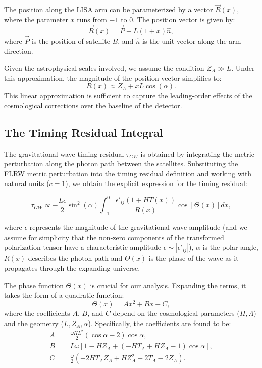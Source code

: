 \documentclass[twocolumn]{revtex4-2}
\begin{document}
The position along the LISA arm can be parameterized by a vector $\vec{R}(x)$, where the parameter $x$ runs from $-1$ to $0$. The position vector is given by:
\begin{equation}
\vec{R}(x) = \vec{P} + L(1+x)\hat{n},
\label{eq:position_vector}
\end{equation}
where $\vec{P}$ is the position of satellite $B$, and $\hat{n}$ is the unit vector along the arm direction. 

Given the astrophysical scales involved, we assume the condition $Z_A \gg L$. Under this approximation, the magnitude of the position vector simplifies to:
\begin{equation}
R(x) \approx Z_A + xL \cos(\alpha).
\label{eq:R_approx}
\end{equation}
This linear approximation is sufficient to capture the leading-order effects of the cosmological corrections over the baseline of the detector.


\subsection{The Timing Residual Integral}
The gravitational wave timing residual $\tau_{GW}$ is obtained by integrating the metric perturbation along the photon path between the satellites. Substituting the FLRW metric perturbation into the timing residual definition and working with natural units ($c=1$), we obtain the explicit expression for the timing residual:

\begin{equation}
\tau_{GW} \propto -\frac{L\epsilon}{2}\sin^{2}(\alpha) \int_{-1}^{0} \frac{\epsilon'_{ij}(1+H T(x))}{R(x)}  \cos[\Theta(x)] dx,
\label{eq:tau_explicit}
\end{equation}

\noindent where $\epsilon$ represents the magnitude of the gravitational wave amplitude (and we assume for simplicity that the non-zero components of the transformed polarization tensor have a characteristic amplitude $\epsilon \sim |\epsilon'_{ij}|$), $\alpha$ is the polar angle, $R(x)$ describes the photon path and $\Theta(x)$ is the phase of the wave as it propagates through the expanding universe. 

The phase function $\Theta(x)$ is crucial for our analysis. Expanding the terms, it takes the form of a quadratic function:
\begin{equation}
\Theta(x) = A x^2 + B x + C,
\label{eq:phase_quadratic}
\end{equation}
where the coefficients $A$, $B$, and $C$ depend on the cosmological parameters ($H, \Lambda$) and the geometry ($L, Z_A, \alpha$). Specifically, the coefficients are found to be:
\begin{align}
A &= \frac{\omega H L^2}{2} (\cos\alpha - 2) \cos\alpha, \\
B &= L\omega \left[1 -H Z_A + (-H T_A + H Z_A - 1) \cos\alpha \right], \\
C &= \frac{\omega}{2} (-2 H T_A Z_A + H Z_A^2 + 2 T_A - 2 Z_A).
\end{align}
\end{document}
